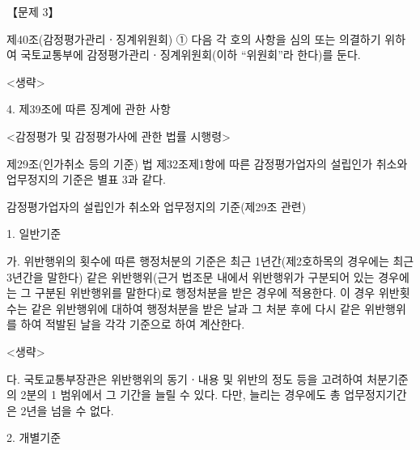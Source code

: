 \begin{longquestion}{【문제 3】}
\begin{framedtext}
제40조(감정평가관리ㆍ징계위원회) ① 다음 각 호의 사항을 심의 또는 의결하기 위하여 국토교통부에 감정평가관리ㆍ징계위원회(이하 “위원회”라 한다)를 둔다. \par
<생략> \par
4. 제39조에 따른 징계에 관한 사항 \par
<감정평가 및 감정평가사에 관한 법률 시행령> \par
제29조(인가취소 등의 기준) 법 제32조제1항에 따른 감정평가업자의 설립인가 취소와 업무정지의 기준은 별표 3과 같다. \par
[별표 3] 감정평가업자의 설립인가 취소와 업무정지의 기준(제29조 관련) \par
1. 일반기준 \par
가. 위반행위의 횟수에 따른 행정처분의 기준은 최근 1년간(제2호하목의 경우에는 최근 3년간을 말한다) 같은 위반행위(근거 법조문 내에서 위반행위가 구분되어 있는 경우에는 그 구분된 위반행위를 말한다)로 행정처분을 받은 경우에 적용한다. 이 경우 위반횟수는 같은 위반행위에 대하여 행정처분을 받은 날과 그 처분 후에 다시 같은 위반행위를 하여 적발된 날을 각각 기준으로 하여 계산한다. \par
<생략> \par
다. 국토교통부장관은 위반행위의 동기ㆍ내용 및 위반의 정도 등을 고려하여 처분기준의 2분의 1 범위에서 그 기간을 늘릴 수 있다. 다만, 늘리는 경우에도 총 업무정지기간은 2년을 넘을 수 없다. \par
2. 개별기준 {\small\centering
{}\par}
\end{framedtext}
\end{longquestion}
